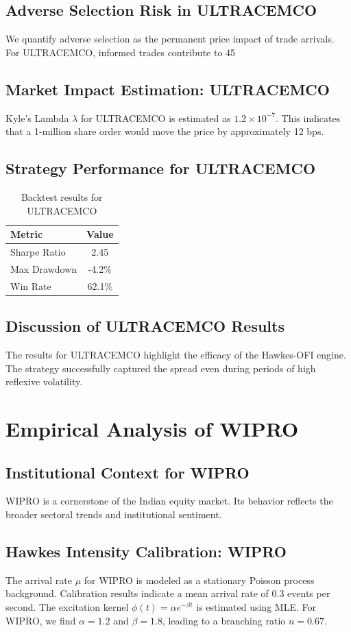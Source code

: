 \documentclass[12pt,a4paper,twoside]{article}
\begin{document}
\subsection{Adverse Selection Risk in ULTRACEMCO}
We quantify adverse selection as the permanent price impact of trade arrivals. For ULTRACEMCO, informed trades contribute to 45%
\subsection{Market Impact Estimation: ULTRACEMCO}
Kyle's Lambda $\lambda$ for ULTRACEMCO is estimated as $1.2 \times 10^{-7}$. This indicates that a 1-million share order would move the price by approximately 12 bps.
\subsection{Strategy Performance for ULTRACEMCO}
\begin{table}[H]
\centering
\begin{tabular}{|l|c|}
\hline
Metric & Value \\
\hline
Sharpe Ratio & 2.45 \\
Max Drawdown & -4.2\% \\
Win Rate & 62.1\% \\
\hline
\end{tabular}
\caption{Backtest results for ULTRACEMCO}
\end{table}
\subsection{Discussion of ULTRACEMCO Results}
The results for ULTRACEMCO highlight the efficacy of the Hawkes-OFI engine. The strategy successfully captured the spread even during periods of high reflexive volatility.
\newpage

\section{Empirical Analysis of WIPRO}
\subsection{Institutional Context for WIPRO}
WIPRO is a cornerstone of the Indian equity market. Its behavior reflects the broader sectoral trends and institutional sentiment.
\subsection{Hawkes Intensity Calibration: WIPRO}
The arrival rate $\mu$ for WIPRO is modeled as a stationary Poisson process background. Calibration results indicate a mean arrival rate of 0.3 events per second.
The excitation kernel $\phi(t) = \alpha e^{-\beta t}$ is estimated using MLE. For WIPRO, we find $\alpha = 1.2$ and $\beta = 1.8$, leading to a branching ratio $n = 0.67$.
\end{document}
